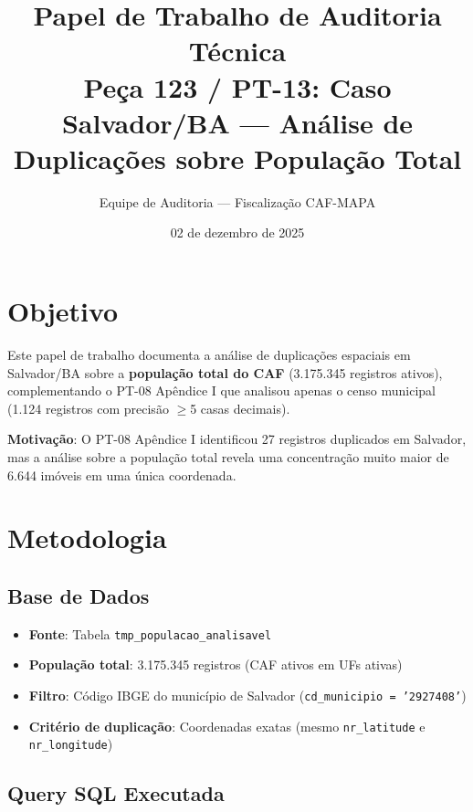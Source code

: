 \documentclass[11pt,a4paper]{article}
\title{Papel de Trabalho de Auditoria Técnica\\
\textbf{Peça 123 / PT-13: Caso Salvador/BA --- Análise de Duplicações sobre População Total}}
\author{Equipe de Auditoria --- Fiscalização CAF-MAPA}
\date{02 de dezembro de 2025}
\begin{document}
\maketitle

\section{Objetivo}

Este papel de trabalho documenta a análise de duplicações espaciais em Salvador/BA
sobre a \textbf{população total do CAF} (3.175.345 registros ativos), complementando
o PT-08 Apêndice I que analisou apenas o censo municipal (1.124 registros com
precisão $\geq$5 casas decimais).

\textbf{Motivação}: O PT-08 Apêndice I identificou 27 registros duplicados em Salvador,
mas a análise sobre a população total revela uma concentração muito maior de 6.644
imóveis em uma única coordenada.

\section{Metodologia}

\subsection{Base de Dados}

\begin{itemize}
    \item \textbf{Fonte}: Tabela \texttt{tmp\_populacao\_analisavel}
    \item \textbf{População total}: 3.175.345 registros (CAF ativos em UFs ativas)
    \item \textbf{Filtro}: Código IBGE do município de Salvador (\texttt{cd\_municipio = '2927408'})
    \item \textbf{Critério de duplicação}: Coordenadas exatas (mesmo \texttt{nr\_latitude} e \texttt{nr\_longitude})
\end{itemize}

\subsection{Query SQL Executada}
\end{document}
